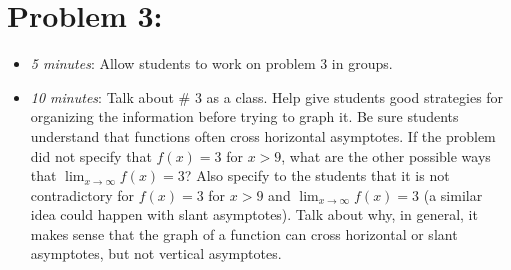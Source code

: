 \documentclass[handout,nooutcomes]{ximera}
\begin{document}
	
	
\section*{Problem 3:}

	\begin{itemize}
	
	\item  \emph{5 minutes}:  Allow students to work on problem 3 in groups.
	
	\item  \emph{10 minutes}:  Talk about \# 3 as a class.  Help give students good strategies for organizing the information before trying to graph it.  Be sure students understand that functions often cross horizontal asymptotes.  If the problem did not specify that $f(x)=3$ for $x>9$, what are the other possible ways that $\lim_{x \to \infty} f(x) = 3$?  Also specify to the students that it is not contradictory for $f(x) = 3$ for $x>9$ and $\lim_{x \to \infty} f(x) = 3$ (a similar idea could happen with slant asymptotes).  Talk about why, in general, it makes sense that the graph of a function can cross horizontal or slant asymptotes, but not vertical asymptotes.
	
	\end{itemize}
	
	
	

	
	
	
\end{document}
